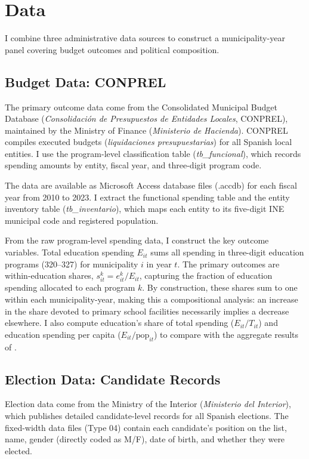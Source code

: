 \documentclass[12pt]{article}
\begin{document}
\section{Data}

I combine three administrative data sources to construct a municipality-year panel covering budget outcomes and political composition.

\subsection{Budget Data: CONPREL}

The primary outcome data come from the Consolidated Municipal Budget Database (\emph{Consolidaci\'{o}n de Presupuestos de Entidades Locales}, CONPREL), maintained by the Ministry of Finance (\emph{Ministerio de Hacienda}). CONPREL compiles executed budgets (\emph{liquidaciones presupuestarias}) for all Spanish local entities. I use the program-level classification table (\emph{tb\_funcional}), which records spending amounts by entity, fiscal year, and three-digit program code.

The data are available as Microsoft Access database files (.accdb) for each fiscal year from 2010 to 2023. I extract the functional spending table and the entity inventory table (\emph{tb\_inventario}), which maps each entity to its five-digit INE municipal code and registered population.

From the raw program-level spending data, I construct the key outcome variables. Total education spending $E_{it}$ sums all spending in three-digit education programs (320--327) for municipality $i$ in year $t$. The primary outcomes are within-education shares, $s_{it}^k = e_{it}^k / E_{it}$, capturing the fraction of education spending allocated to each program $k$. By construction, these shares sum to one within each municipality-year, making this a compositional analysis: an increase in the share devoted to primary school facilities necessarily implies a decrease elsewhere. I also compute education's share of total spending ($E_{it} / T_{it}$) and education spending per capita ($E_{it} / \text{pop}_{it}$) to compare with the aggregate results of \citet{bagues2021can}.

\subsection{Election Data: Candidate Records}

Election data come from the Ministry of the Interior (\emph{Ministerio del Interior}), which publishes detailed candidate-level records for all Spanish elections. The fixed-width data files (Type 04) contain each candidate's position on the list, name, gender (directly coded as M/F), date of birth, and whether they were elected.
\end{document}
